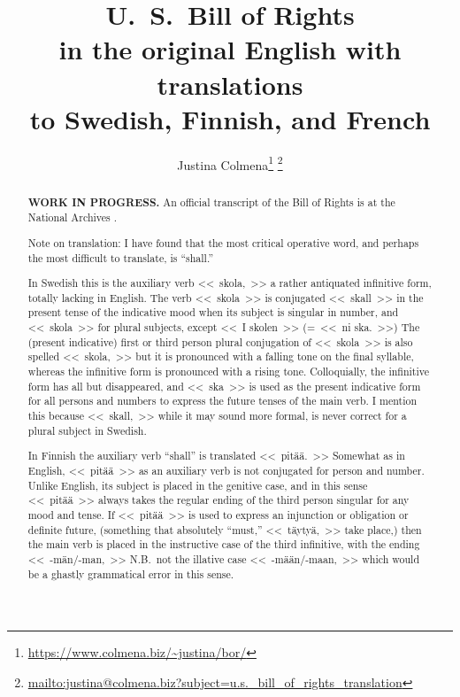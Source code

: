\documentclass[a4paper,landscape,10pt]{article}
\title{{\huge \textbf{U.~S.\ Bill of Rights}}\\
	in the original English with translations\\
	to Swedish, Finnish, and French}
\author{Justina Colmena\footnote{\url{https://www.colmena.biz/~justina/bor/}} \footnote{\url{mailto:justina@colmena.biz?subject=u.s._bill_of_rights_translation}}}
\begin{document}
	
\sloppy
\maketitle
\begin{abstract}
	{\color{red}\textbf{WORK IN PROGRESS.}} An official transcript of the Bill of Rights is at the National Archives \cite{national-archives}.
	
	Note on translation:  I have found that the most critical operative word, and perhaps the most difficult to translate, is ``shall.''
	
	In Swedish this is the auxiliary verb \foreignlanguage{swedish}{<<~skola,~>>} a rather antiquated infinitive form, totally lacking in English.  The verb \foreignlanguage{swedish}{<<~skola~>>} is conjugated \foreignlanguage{swedish}{<<~skall~>>} in the present tense of the indicative mood when its subject is singular in number, and \foreignlanguage{swedish}{<<~skola~>>} for plural subjects, except \foreignlanguage{swedish}{<<~I skolen~>> (=~<<~ni ska.~>>)}  The (present indicative) first or third person plural conjugation of \foreignlanguage{swedish}{<<~skola~>>} is also spelled \foreignlanguage{swedish}{<<~skola,~>>} but it is pronounced with a falling tone on the final syllable, whereas the infinitive form is pronounced with a rising tone.  Colloquially, the infinitive form has all but disappeared, and \foreignlanguage{swedish}{<<~ska~>>} is used as the present indicative form for all persons and numbers to express the future tenses of the main verb.  I mention this because \foreignlanguage{swedish}{<<~skall,~>>} while it may sound more formal, is never correct for a plural subject in Swedish.
		
	In Finnish the auxiliary verb ``shall'' is translated \foreignlanguage{finnish}{<<~pitää.~>>}  Somewhat as in English, \foreignlanguage{finnish}{<<~pitää~>>} as an auxiliary verb is not conjugated for person and number.  Unlike English, its subject is placed in the genitive case, and in this sense \foreignlanguage{finnish}{<<~pitää~>>}  always takes the regular ending of the third person singular for any mood and tense.  If \foreignlanguage{finnish}{<<~pitää~>>} is used to express an injunction or obligation or definite future, (something that absolutely ``must,'' \foreignlanguage{finnish}{<<~täytyä,~>>} take place,) then the main verb is placed in the instructive case of the third infinitive, with the ending \foreignlanguage{finnish}{<<~\mbox{-män/-man,}~>>} N.B.\ not the illative case \foreignlanguage{finnish}{<<~\mbox{-mään/-maan,}~>>} which would be a ghastly grammatical error in this sense.


\end{abstract}
\end{document}
